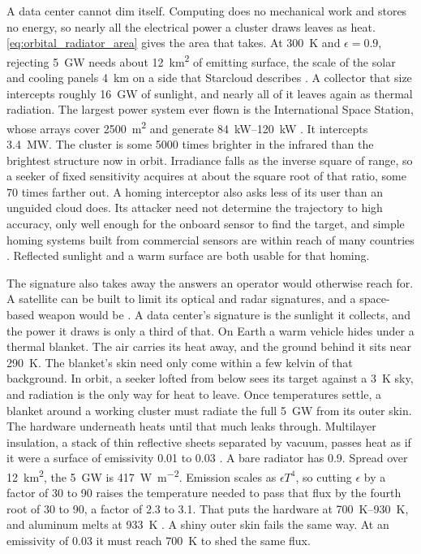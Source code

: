 \documentclass{article}
\begin{document}
A data center cannot dim itself. Computing does no mechanical work and stores no energy, so nearly all the electrical power a cluster draws leaves as heat. \autoref{eq:orbital_radiator_area} gives the area that takes. At \SI{300}{\kelvin} and $\epsilon = 0.9$, rejecting \SI{5}{\giga\watt} needs about \SI{12}{\kilo\meter\squared} of emitting surface, the scale of the solar and cooling panels \SI{4}{\kilo\meter} on a side that Starcloud describes \cite{nvidia2025_starcloud}. A collector that size intercepts roughly \SI{16}{\giga\watt} of sunlight, and nearly all of it leaves again as thermal radiation. The largest power system ever flown is the International Space Station, whose arrays cover \SI{2500}{\square\meter} and generate \SIrange{84}{120}{\kilo\watt} \cite{nasa_iss_solar_arrays}. It intercepts \SI{3.4}{\mega\watt}. The cluster is some 5000 times brighter in the infrared than the brightest structure now in orbit. Irradiance falls as the inverse square of range, so a seeker of fixed sensitivity acquires at about the square root of that ratio, some 70 times farther out. A homing interceptor also asks less of its user than an unguided cloud does. Its attacker need not determine the trajectory to high accuracy, only well enough for the onboard sensor to find the target, and simple homing systems built from commercial sensors are within reach of many countries \cite{wright2005_physics_space_security}. Reflected sunlight and a warm surface are both usable for that homing.

The signature also takes away the answers an operator would otherwise reach for. A satellite can be built to limit its optical and radar signatures, and a space-based weapon would be \cite{wright2005_physics_space_security}. A data center's signature is the sunlight it collects, and the power it draws is only a third of that. On Earth a warm vehicle hides under a thermal blanket. The air carries its heat away, and the ground behind it sits near \SI{290}{\kelvin}. The blanket's skin need only come within a few kelvin of that background. In orbit, a seeker lofted from below sees its target against a \SI{3}{\kelvin} sky, and radiation is the only way for heat to leave. Once temperatures settle, a blanket around a working cluster must radiate the full \SI{5}{\giga\watt} from its outer skin. The hardware underneath heats until that much leaks through. Multilayer insulation, a stack of thin reflective sheets separated by vacuum, passes heat as if it were a surface of emissivity 0.01 to 0.03 \cite{gilmore2002spacecraft}. A bare radiator has 0.9. Spread over \SI{12}{\kilo\meter\squared}, the \SI{5}{\giga\watt} is \SI{417}{\watt\per\square\meter}. Emission scales as $\epsilon T^4$, so cutting $\epsilon$ by a factor of 30 to 90 raises the temperature needed to pass that flux by the fourth root of 30 to 90, a factor of 2.3 to 3.1. That puts the hardware at \SIrange{700}{930}{\kelvin}, and aluminum melts at \SI{933}{\kelvin} \cite{crc_handbook}. A shiny outer skin fails the same way. At an emissivity of 0.03 it must reach \SI{700}{\kelvin} to shed the same flux.
\end{document}
